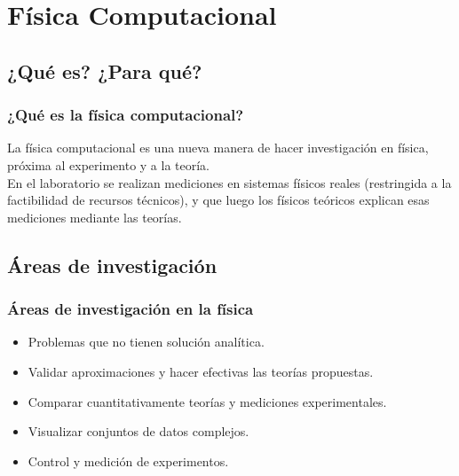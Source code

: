 \section{Física Computacional}
\subsection{¿Qué es? ¿Para qué?}
\begin{frame}
\frametitle{¿Qué es la física computacional?}
La física computacional es una nueva manera de hacer investigación en física, próxima al
experimento y a la teoría.
\\
\medskip
En el laboratorio se realizan mediciones en sistemas físicos reales (restringida a la factibilidad de recursos técnicos), y que luego los físicos teóricos explican esas mediciones mediante las teorías.
\end{frame}
\subsection{Áreas de investigación}
\begin{frame}
\frametitle{Áreas de investigación en la física}
\begin{itemize}[<+->]
	\item Problemas que no tienen solución analítica.
	\item Validar aproximaciones y hacer efectivas las teorías propuestas.
	\item Comparar cuantitativamente teorías y mediciones experimentales.
	\item Visualizar conjuntos de datos complejos.
	\item Control y medición de experimentos.
\end{itemize}
\end{frame}
